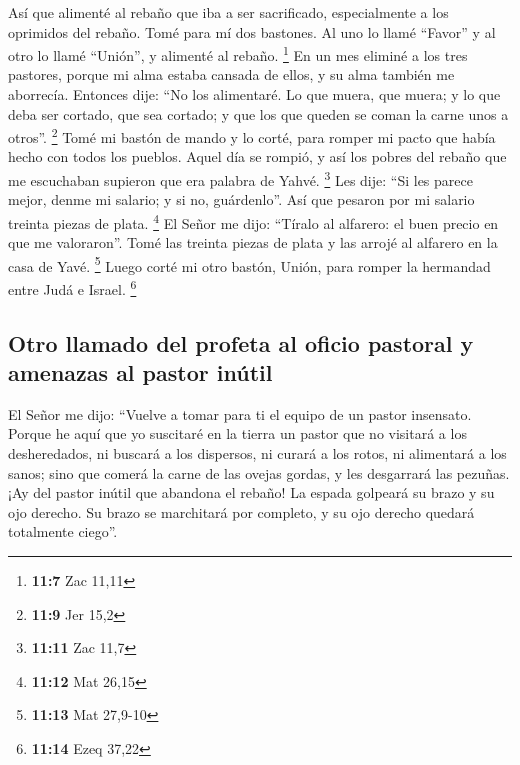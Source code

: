\begin{paracol}{2}
 Así que alimenté al rebaño que iba a ser sacrificado,
especialmente a los oprimidos del rebaño. Tomé para mí dos bastones. Al
uno lo llamé ``Favor'' y al otro lo llamé ``Unión'', y alimenté al
rebaño. \footnote{\textbf{11:7} Zac 11,11}  En un mes
eliminé a los tres pastores, porque mi alma estaba cansada de ellos, y
su alma también me aborrecía.  Entonces dije: ``No los
alimentaré. Lo que muera, que muera; y lo que deba ser cortado, que sea
cortado; y que los que queden se coman la carne unos a otros''.
\footnote{\textbf{11:9} Jer 15,2}  Tomé mi bastón de
mando y lo corté, para romper mi pacto que había hecho con todos los
pueblos.  Aquel día se rompió, y así los pobres del
rebaño que me escuchaban supieron que era palabra de Yahvé. \footnote{\textbf{11:11}
  Zac 11,7}  Les dije: ``Si les parece mejor, denme mi
salario; y si no, guárdenlo''. Así que pesaron por mi salario treinta
piezas de plata. \footnote{\textbf{11:12} Mat 26,15}  El
Señor me dijo: ``Tíralo al alfarero: el buen precio en que me
valoraron''. Tomé las treinta piezas de plata y las arrojé al alfarero
en la casa de Yavé. \footnote{\textbf{11:13} Mat 27,9-10}
 Luego corté mi otro bastón, Unión, para romper la
hermandad entre Judá e Israel. \footnote{\textbf{11:14} Ezeq 37,22}

\hypertarget{otro-llamado-del-profeta-al-oficio-pastoral-y-amenazas-al-pastor-inuxfatil}{%
\subsection{Otro llamado del profeta al oficio pastoral y amenazas al
pastor
inútil}\label{otro-llamado-del-profeta-al-oficio-pastoral-y-amenazas-al-pastor-inuxfatil}}

 El Señor me dijo: ``Vuelve a tomar para ti el equipo de
un pastor insensato.  Porque he aquí que yo suscitaré en
la tierra un pastor que no visitará a los desheredados, ni buscará a los
dispersos, ni curará a los rotos, ni alimentará a los sanos; sino que
comerá la carne de las ovejas gordas, y les desgarrará las pezuñas.
 ¡Ay del pastor inútil que abandona el rebaño! La espada
golpeará su brazo y su ojo derecho. Su brazo se marchitará por completo,
y su ojo derecho quedará totalmente ciego''.

\switchcolumn
\begin{otherlanguage}{english}

\hypertarget{section-21}{%
}
\end{otherlanguage}
\end{paracol}
